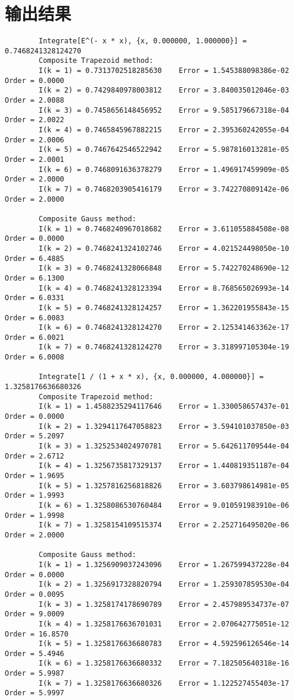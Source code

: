 \documentclass{ctexart}
\begin{document}
\section*{输出结果}
	\begin{verbatim}
		Integrate[E^(- x * x), {x, 0.000000, 1.000000}] = 0.7468241328124270
		Composite Trapezoid method:
		I(k = 1) = 0.7313702518285630 	 Error = 1.545388098386e-02 	 Order = 0.0000
		I(k = 2) = 0.7429840978003812 	 Error = 3.840035012046e-03 	 Order = 2.0088
		I(k = 3) = 0.7458656148456952 	 Error = 9.585179667318e-04 	 Order = 2.0022
		I(k = 4) = 0.7465845967882215 	 Error = 2.395360242055e-04 	 Order = 2.0006
		I(k = 5) = 0.7467642546522942 	 Error = 5.987816013281e-05 	 Order = 2.0001
		I(k = 6) = 0.7468091636378279 	 Error = 1.496917459909e-05 	 Order = 2.0000
		I(k = 7) = 0.7468203905416179 	 Error = 3.742270809142e-06 	 Order = 2.0000
		
		Composite Gauss method:
		I(k = 1) = 0.7468240967018682 	 Error = 3.611055884508e-08 	 Order = 0.0000
		I(k = 2) = 0.7468241324102746 	 Error = 4.021524498050e-10 	 Order = 6.4885
		I(k = 3) = 0.7468241328066848 	 Error = 5.742270248690e-12 	 Order = 6.1300
		I(k = 4) = 0.7468241328123394 	 Error = 8.768565026993e-14 	 Order = 6.0331
		I(k = 5) = 0.7468241328124257 	 Error = 1.362201955843e-15 	 Order = 6.0083
		I(k = 6) = 0.7468241328124270 	 Error = 2.125341463362e-17 	 Order = 6.0021
		I(k = 7) = 0.7468241328124270 	 Error = 3.318997105304e-19 	 Order = 6.0008
		
		Integrate[1 / (1 + x * x), {x, 0.000000, 4.000000}] = 1.3258176636680326
		Composite Trapezoid method:
		I(k = 1) = 1.4588235294117646 	 Error = 1.330058657437e-01 	 Order = 0.0000
		I(k = 2) = 1.3294117647058823 	 Error = 3.594101037850e-03 	 Order = 5.2097
		I(k = 3) = 1.3252534024970781 	 Error = 5.642611709544e-04 	 Order = 2.6712
		I(k = 4) = 1.3256735817329137 	 Error = 1.440819351187e-04 	 Order = 1.9695
		I(k = 5) = 1.3257816256818826 	 Error = 3.603798614981e-05 	 Order = 1.9993
		I(k = 6) = 1.3258086530760484 	 Error = 9.010591983910e-06 	 Order = 1.9998
		I(k = 7) = 1.3258154109515374 	 Error = 2.252716495020e-06 	 Order = 2.0000
		
		Composite Gauss method:
		I(k = 1) = 1.3256909037243096 	 Error = 1.267599437228e-04 	 Order = 0.0000
		I(k = 2) = 1.3256917328820794 	 Error = 1.259307859530e-04 	 Order = 0.0095
		I(k = 3) = 1.3258174178690789 	 Error = 2.457989534737e-07 	 Order = 9.0009
		I(k = 4) = 1.3258176636701031 	 Error = 2.070642775051e-12 	 Order = 16.8570
		I(k = 5) = 1.3258176636680783 	 Error = 4.592596126546e-14 	 Order = 5.4946
		I(k = 6) = 1.3258176636680332 	 Error = 7.182505640318e-16 	 Order = 5.9987
		I(k = 7) = 1.3258176636680326 	 Error = 1.122527455403e-17 	 Order = 5.9997
		

\end{verbatim}
\end{document}
